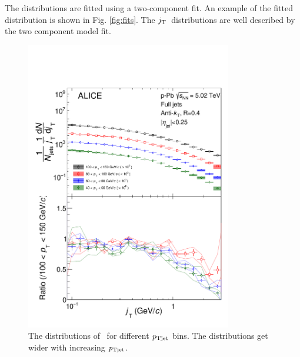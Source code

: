 The distributions are fitted using a two-component fit. An example of the fitted distribution is shown in Fig. \ref{fig:fits}. The $j_{\rm T}$ distributions are well described by the two component model fit.


\begin{figure}[htb]
\begin{center}
\includegraphics[width=0.8\textwidth]{newfigures/jTwithSystematics.pdf}
\caption{The distributions of \jt\ for different $p_{\rm Tjet}$ bins. The distributions get wider with increasing $p_{\rm Tjet}$.}
\label{fig:jt_systematics}
\end{center}
\end{figure}

